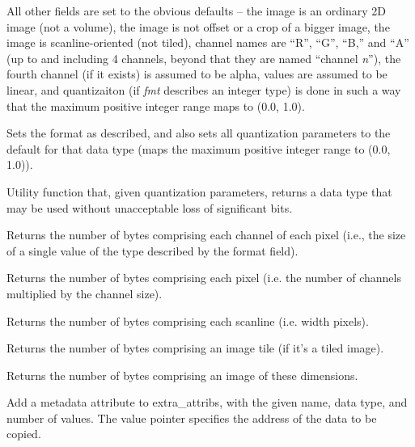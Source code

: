 All other fields are set to the obvious defaults -- the image is an
ordinary 2D image (not a volume), the image is not offset or a crop of a
bigger image, the image is scanline-oriented (not tiled), channel names
are ``R'', ``G'', ``B,'' and ``A'' (up to and including 4 channels,
beyond that they are named ``channel \emph{n}''), the fourth channel (if
it exists) is assumed to be alpha, values are assumed to be linear, and
quantizaiton (if \emph{fmt} describes an integer type) is done in
such a way that the maximum positive integer range maps to (0.0, 1.0).
\apiend

Sets the format as described, and also sets all quantization parameters
to the default for that data type (maps the maximum positive integer
range to (0.0, 1.0)).
\apiend

Utility function that, given quantization parameters, returns a data
type that may be used without unacceptable loss of significant bits.
\apiend

Returns the number of bytes comprising each channel of each pixel (i.e.,
the size of a single value of the type described by the {\kw format} field).
\apiend

Returns the number of bytes comprising each pixel (i.e. the number of
channels multiplied by the channel size).
\apiend

Returns the number of bytes comprising each scanline (i.e. {\kw width} pixels).
\apiend

Returns the number of bytes comprising an image tile (if it's a tiled image).
\apiend

Returns the number of bytes comprising an image of these dimensions.
\apiend


Add a metadata attribute to {\kw extra_attribs}, with the given name,
data type, and number of values.  The {\kw value} pointer specifies
the address of the data to be copied.
\apiend

